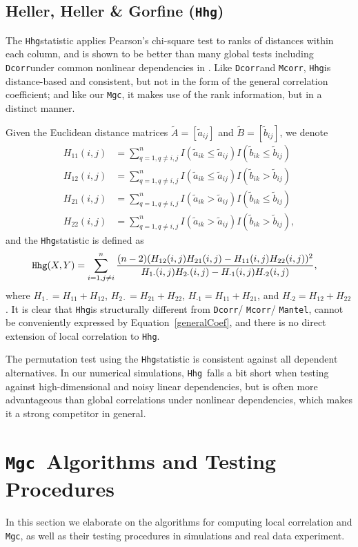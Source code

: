 \documentclass[11pt]{article}
\providecommand{\sct}[1]{{\sc \texttt{#1}}}
\newcommand{\Mgc}{\sct{Mgc}}
\newcommand{\Hhg}{\sct{Hhg}}
\newcommand{\Dcorr}{\sct{Dcorr}}
\newcommand{\Mcorr}{\sct{Mcorr}}
\newcommand{\Mantel}{\sct{Mantel}}
\begin{document}
\subsection{Heller, Heller \& Gorfine (\Hhg)}
\label{appen:hhg}
The \Hhg statistic applies Pearson's chi-square test to ranks of distances within each column, and is shown to be better than many global tests including \Dcorr under common nonlinear dependencies in \cite{GorfineHellerHeller2012, HellerGorfine2013}. Like \Dcorr and \Mcorr, \Hhg is distance-based and consistent, but not in the form of the general correlation coefficient; and like our \Mgc, it makes use of the rank information, but in a distinct manner.

Given the Euclidean distance matrices $\tilde{A}=[\tilde{a}_{ij}]$ and $\tilde{B}=[\tilde{b}_{ij}]$, we denote
\begin{align*}
H_{11}(i,j) &= \sum_{q=1,q\neq i,j}^{n}I(\tilde{a}_{ik} \leq \tilde{a}_{ij})I(\tilde{b}_{ik} \leq \tilde{b}_{ij}) \\
H_{12}(i,j) &= \sum_{q=1,q\neq i,j}^{n}I(\tilde{a}_{ik} \leq \tilde{a}_{ij})I(\tilde{b}_{ik} > \tilde{b}_{ij}) \\
H_{21}(i,j) &= \sum_{q=1,q\neq i,j}^{n}I(\tilde{a}_{ik} > \tilde{a}_{ij})I(\tilde{b}_{ik} \leq \tilde{b}_{ij}) \\
H_{22}(i,j) &= \sum_{q=1,q\neq i,j}^{n}I(\tilde{a}_{ik} > \tilde{a}_{ij})I(\tilde{b}_{ik} > \tilde{b}_{ij}),
\end{align*}
and the \Hhg statistic is defined as
\begin{align*}
\Hhg(X,Y) &= \sum_{i=1,j\neq i}^{n} \frac{(n-2)(H_{12}(i,j)H_{21}(i,j)-H_{11}(i,j)H_{22}(i,j))^2}{H_{1 \cdot}(i,j)H_{2 \cdot}(i,j)-H_{\cdot 1}(i,j)H_{\cdot 2}(i,j)},
\end{align*}
where $H_{1 \cdot}=H_{11}+H_{12}$, $H_{2 \cdot}=H_{21}+H_{22}$, $H_{\cdot 1}=H_{11}+H_{21}$, and $H_{\cdot 2}=H_{12}+H_{22}$. It is clear that \Hhg is structurally different from \Dcorr / \Mcorr / \Mantel, cannot be conveniently expressed by Equation~\ref{generalCoef}, and there is no direct extension of local correlation to \Hhg.

The permutation test using the \Hhg statistic is consistent against all dependent alternatives. In our numerical simulations, \Hhg~falls a bit short when testing against high-dimensional and noisy linear dependencies, but is often more advantageous than global correlations under nonlinear dependencies, which makes it a strong competitor in general. 

\section{\Mgc~Algorithms and Testing Procedures}
\label{appen:tests}
In this section we elaborate on the algorithms for computing local correlation and \Mgc, as well as their testing procedures in simulations and real data experiment. 
\end{document}
